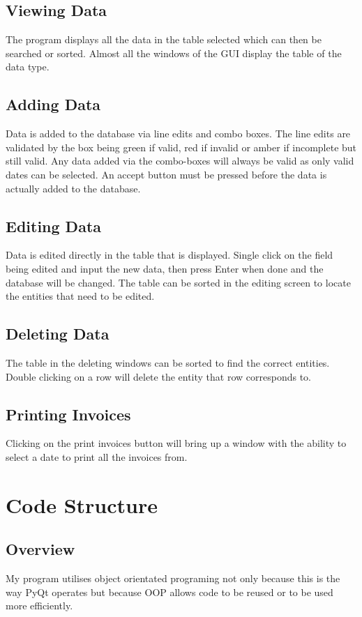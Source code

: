 \subsection{Viewing Data}
The program displays all the data in the table selected which can then be searched or sorted. Almost all the windows of the GUI display the table of the data type.

\subsection{Adding Data}
Data is added to the database via line edits and combo boxes. The line edits are validated by the box being green if valid, red if invalid or amber if incomplete but still valid. Any data added via the combo-boxes will always be valid as only valid dates can be selected. An accept button must be pressed before the data is actually added to the database.

\subsection{Editing Data}
Data is edited directly in the table that is displayed. Single click on the field being edited and input the new data, then press Enter when done and the database will be changed. The table can be sorted in the editing screen to locate the entities that need to be edited.

\subsection{Deleting Data}
The table in the deleting windows can be sorted to find the correct entities. Double clicking on a row will delete the entity that row corresponds to.

\subsection{Printing Invoices}
Clicking on the print invoices button will bring up a window with the ability to select a date to print all the invoices from.


\section{Code Structure}

\subsection{Overview}
My program utilises object orientated programing not only because this is the way PyQt operates but because OOP allows code to be reused or to be used more efficiently.


